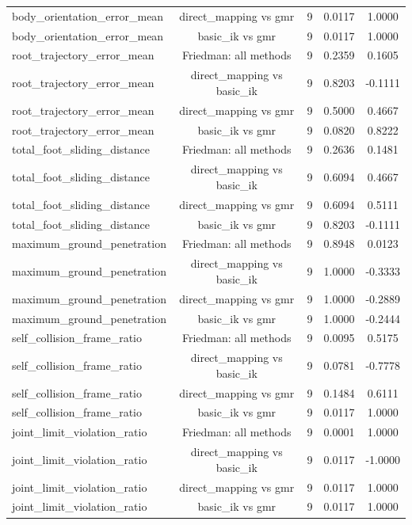 \begin{table}[t]
{\begin{tabular}{lcccc}
body\_orientation\_error\_mean & direct\_mapping vs gmr & 9 & 0.0117 & 1.0000 \\
body\_orientation\_error\_mean & basic\_ik vs gmr & 9 & 0.0117 & 1.0000 \\
root\_trajectory\_error\_mean & Friedman: all methods & 9 & 0.2359 & 0.1605 \\
root\_trajectory\_error\_mean & direct\_mapping vs basic\_ik & 9 & 0.8203 & -0.1111 \\
root\_trajectory\_error\_mean & direct\_mapping vs gmr & 9 & 0.5000 & 0.4667 \\
root\_trajectory\_error\_mean & basic\_ik vs gmr & 9 & 0.0820 & 0.8222 \\
total\_foot\_sliding\_distance & Friedman: all methods & 9 & 0.2636 & 0.1481 \\
total\_foot\_sliding\_distance & direct\_mapping vs basic\_ik & 9 & 0.6094 & 0.4667 \\
total\_foot\_sliding\_distance & direct\_mapping vs gmr & 9 & 0.6094 & 0.5111 \\
total\_foot\_sliding\_distance & basic\_ik vs gmr & 9 & 0.8203 & -0.1111 \\
maximum\_ground\_penetration & Friedman: all methods & 9 & 0.8948 & 0.0123 \\
maximum\_ground\_penetration & direct\_mapping vs basic\_ik & 9 & 1.0000 & -0.3333 \\
maximum\_ground\_penetration & direct\_mapping vs gmr & 9 & 1.0000 & -0.2889 \\
maximum\_ground\_penetration & basic\_ik vs gmr & 9 & 1.0000 & -0.2444 \\
self\_collision\_frame\_ratio & Friedman: all methods & 9 & 0.0095 & 0.5175 \\
self\_collision\_frame\_ratio & direct\_mapping vs basic\_ik & 9 & 0.0781 & -0.7778 \\
self\_collision\_frame\_ratio & direct\_mapping vs gmr & 9 & 0.1484 & 0.6111 \\
self\_collision\_frame\_ratio & basic\_ik vs gmr & 9 & 0.0117 & 1.0000 \\
joint\_limit\_violation\_ratio & Friedman: all methods & 9 & 0.0001 & 1.0000 \\
joint\_limit\_violation\_ratio & direct\_mapping vs basic\_ik & 9 & 0.0117 & -1.0000 \\
joint\_limit\_violation\_ratio & direct\_mapping vs gmr & 9 & 0.0117 & 1.0000 \\
joint\_limit\_violation\_ratio & basic\_ik vs gmr & 9 & 0.0117 & 1.0000 \\

\end{tabular}}
\end{table}
